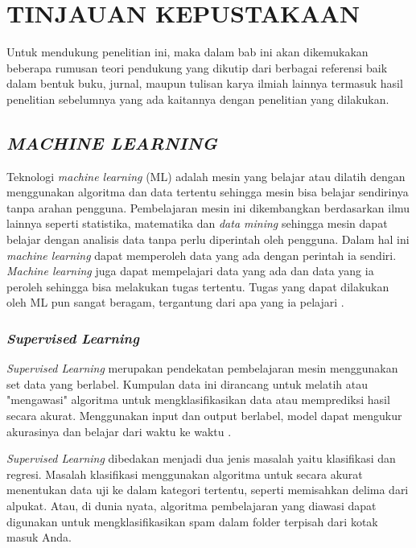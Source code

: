 \fancyhf{}
\fancyfoot[C]{\thepage}
\chapter{TINJAUAN KEPUSTAKAAN}

\par Untuk mendukung penelitian ini, maka dalam bab ini akan dikemukakan beberapa rumusan teori pendukung yang dikutip dari berbagai referensi baik dalam bentuk buku, jurnal, maupun tulisan karya ilmiah lainnya termasuk hasil penelitian sebelumnya yang ada kaitannya dengan penelitian yang dilakukan.

\section{\textit{MACHINE LEARNING}}
Teknologi \textit{machine learning} (ML) adalah mesin yang belajar atau dilatih dengan menggunakan algoritma dan data tertentu sehingga mesin bisa belajar sendirinya tanpa arahan pengguna. Pembelajaran mesin ini dikembangkan berdasarkan ilmu lainnya seperti statistika, matematika dan \textit{data mining} sehingga mesin dapat belajar dengan analisis data tanpa perlu diperintah oleh pengguna. Dalam hal ini \textit{machine learning} dapat memperoleh data yang ada dengan perintah ia sendiri. \textit{Machine learning} juga dapat mempelajari data yang ada dan data yang ia peroleh sehingga bisa melakukan tugas tertentu. Tugas yang dapat dilakukan oleh ML pun sangat beragam, tergantung dari apa yang ia pelajari \citep{Baker2019}.

\subsection{\textit{Supervised Learning}}
\textit{Supervised Learning} merupakan pendekatan pembelajaran mesin menggunakan set data yang berlabel. Kumpulan data ini dirancang untuk melatih atau "mengawasi" algoritma untuk mengklasifikasikan data atau memprediksi hasil secara akurat. Menggunakan input dan output berlabel, model dapat mengukur akurasinya dan belajar dari waktu ke waktu \citep{Gramejo2020}.

\par \textit{Supervised Learning} dibedakan menjadi dua jenis masalah yaitu klasifikasi dan regresi. Masalah klasifikasi menggunakan algoritma untuk secara akurat menentukan data uji ke dalam kategori tertentu, seperti memisahkan delima dari alpukat. Atau, di dunia nyata, algoritma pembelajaran yang diawasi dapat digunakan untuk mengklasifikasikan spam dalam folder terpisah dari kotak masuk Anda.

